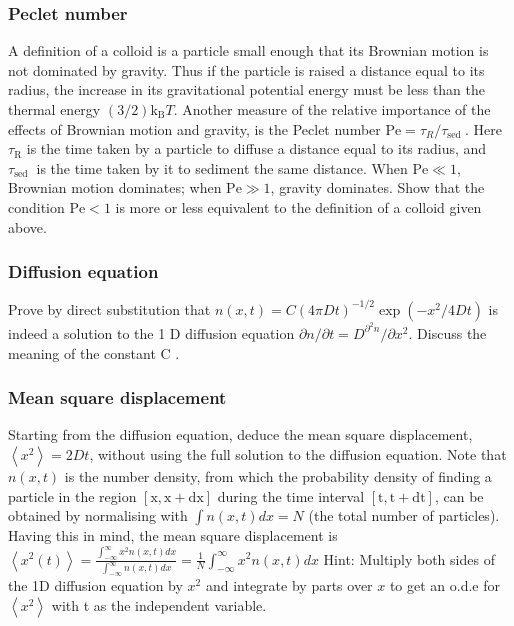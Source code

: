 \documentclass[
  letterpaper,
  DIV=11,
  numbers=noendperiod]{scrartcl}
\begin{document}
\subsubsection{Peclet number}\label{peclet-number}

A definition of a colloid is a particle small enough that its Brownian
motion is not dominated by gravity. Thus if the particle is raised a
distance equal to its radius, the increase in its gravitational
potential energy must be less than the thermal energy
\((3 / 2) \mathrm{k}_{\mathrm{B}} T\). Another measure of the relative
importance of the effects of Brownian motion and gravity, is the Peclet
number \(\mathrm{Pe}=\tau_{R} / \tau_{\text {sed }}\). Here
\(\tau_{\mathrm{R}}\) is the time taken by a particle to diffuse a
distance equal to its radius, and \(\tau_{\text {sed }}\) is the time
taken by it to sediment the same distance. When \(\mathrm{Pe} \ll 1\),
Brownian motion dominates; when \(\mathrm{Pe} \gg 1\), gravity
dominates. Show that the condition \(\mathrm{Pe}<1\) is more or less
equivalent to the definition of a colloid given above.

\subsubsection{Diffusion equation}\label{diffusion-equation}

Prove by direct substitution that
\(n(x, t)=C(4 \pi D t)^{-1 / 2} \exp \left(-x^{2} / 4 D t\right)\) is
indeed a solution to the 1 D diffusion equation
\(\partial n / \partial t=D^{\partial^{2} n} / \partial x^{2}\). Discuss
the meaning of the constant C .

\subsubsection{Mean square displacement}\label{mean-square-displacement}

Starting from the diffusion equation, deduce the mean square
displacement, \(\left\langle x^{2}\right\rangle=2 D t\), without using
the full solution to the diffusion equation. Note that \(n(x, t)\) is
the number density, from which the probability density of finding a
particle in the region \([\mathrm{x}, \mathrm{x}+\mathrm{dx}]\) during
the time interval \([\mathrm{t}, \mathrm{t}+\mathrm{dt}]\), can be
obtained by normalising with \(\int n(x, t) d x=N\) (the total number of
particles). Having this in mind, the mean square displacement is
\(\left\langle x^{2}(t)\right\rangle=\frac{\int_{-\infty}^{\infty} x^{2} n(x, t) d x}{\int_{-\infty}^{\infty} n(x, t) d x}=\frac{1}{N} \int_{-\infty}^{\infty} x^{2} n(x, t) d x\)
Hint: Multiply both sides of the 1D diffusion equation by \(x^{2}\) and
integrate by parts over \(x\) to get an o.d.e for
\(\left\langle x^{2}\right\rangle\) with t as the independent variable.
\end{document}
